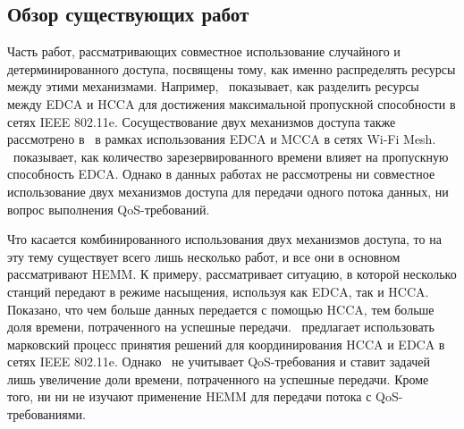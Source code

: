 \subsection{Обзор существующих работ}
\label{sec:related_papers}

Часть работ, рассматривающих совместное использование случайного и детерминированного доступа, посвящены тому, как именно распределять ресурсы между этими механизмами. Например,~\cite{siris2006resource} показывает, как разделить ресурсы между EDCA и HCCA для достижения максимальной пропускной способности в сетях IEEE 802.11e. Сосуществование двух механизмов доступа также рассмотрено в~\cite{Krasilov2013} в рамках использования EDCA и MCCA в сетях Wi-Fi Mesh. \cite{Krasilov2013}~показывает, как количество зарезервированного времени влияет на пропускную способность EDCA. Однако в данных работах не рассмотрены ни совместное использование двух механизмов доступа для передачи одного потока данных, ни вопрос выполнения QoS-требований. 


Что касается комбинированного использования двух механизмов доступа, то на эту тему существует всего лишь несколько работ, и все они в основном рассматривают HEMM. К примеру, \cite{kuan2007utilization} рассматривает ситуацию, в которой несколько станций передают в режиме насыщения, используя как EDCA, так и HCCA. Показано, что чем больше данных передается с помощью HCCA, тем больше доля времени, потраченного на успешные передачи. \cite{Ng2012}~предлагает использовать марковский процесс принятия решений для координирования HCCA и EDCA в сетях  IEEE 802.11e. Однако \cite{Ng2012}~не учитывает QoS-требования и ставит задачей лишь увеличение доли времени, потраченного на успешные передачи. Кроме того, ни  \cite{kuan2007utilization} ни \cite{Ng2012} не изучают применение HEMM для передачи потока с QoS-требованиями.

